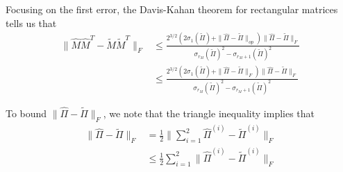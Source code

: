 \documentclass[notheorems]{beamer}
\theoremstyle{definition}
\begin{document}
\begin{frame}
Focusing on the first error, the Davis-Kahan theorem for rectangular matrices tells us that 
\begin{align*}
\|\hat{M}\hat{M}^T - \tilde{M}\tilde{M}^T\|_F
& \leq \frac{2^{3/2}(2 \sigma_1(\tilde{\Pi}) +  \|\hat{\Pi} - \tilde{\Pi}\|_{op})\|\hat{\Pi} - \tilde{\Pi}\|_F}{\sigma_{r_M}(\tilde{\Pi})^2 - \sigma_{r_M + 1}(\tilde{\Pi})^2} \\
& \leq \frac{2^{3/2}(2 \sigma_1(\tilde{\Pi}) +  \|\hat{\Pi} - \tilde{\Pi}\|_F)\|\hat{\Pi} - \tilde{\Pi}\|_F}{\sigma_{r_M}(\tilde{\Pi})^2 - \sigma_{r_M + 1}(\tilde{\Pi})^2}
\end{align*}
\end{frame}
















\begin{frame}
To bound $ \|\hat{\Pi} - \tilde{\Pi}\|_F$, we note that the triangle inequality implies that 
\begin{align*}
    \|\hat{\Pi} - \tilde{\Pi}\|_F
    &= \frac{1}{2} \bigg \|\sum_{i=1}^2 \hat{\Pi}^{(i)} - \tilde{\Pi}^{(i)}\bigg \|_F \\
    & \leq  \frac{1}{2}\sum_{i=1}^2 \|\hat{\Pi}^{(i)} - \tilde{\Pi}^{(i)}\|_F \\
\end{align*}
\end{frame}
\end{document}
